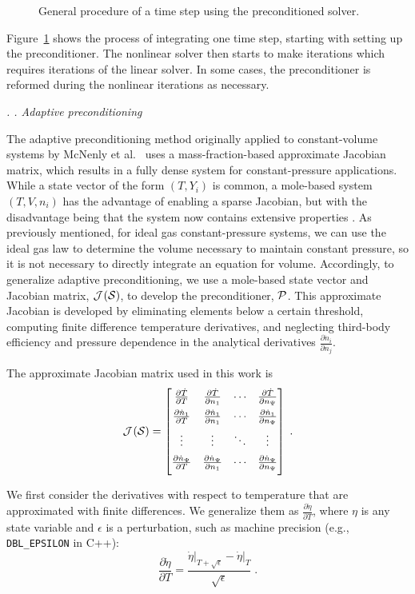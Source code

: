 \documentclass[twocolumn,10pt]{article}
\renewcommand{\subsection}%
              [1]%
              {%
               \bgroup%
               \flushleft%
               \small\em%
               \stepcounter{subsection}%
               \arabic{section}.%
               \arabic{subsection}. #1%
               \par%
               \egroup%
              }%
\newcommand{\sectionTwo}[1]{\subsection{#1} \addvspace{10pt}}
\newcommand{\revised}[2]{#1}  %
\begin{document}
\begin{figure}[htb]
    \centering
    \IntegrationOverview[0.85]{}
    \caption{General procedure of a time step using the preconditioned solver.}
    \label{f:integration_process}
\end{figure}

Figure~\ref{f:integration_process} shows the process of integrating one time step, starting with setting up the preconditioner.
The nonlinear solver then starts to make iterations which requires iterations of the linear solver.
In some cases, the preconditioner is reformed during the nonlinear iterations as necessary.

\sectionTwo{Adaptive preconditioning}
\label{sec:methods-adaptive}

The adaptive preconditioning method originally applied to constant-volume systems
by McNenly et al.~\cite{mcnenly_faster_2015} uses a mass-fraction-based approximate Jacobian matrix, which results in a fully dense system for constant-pressure applications. 
\revised{While a state vector of the form $(T, Y_i)$ is common, a mole-based system $(T, V, n_i)$ has the advantage of enabling a sparse Jacobian, but with the disadvantage being that the system now contains extensive properties \cite{schwer_upgrading_2002}. 
As previously mentioned, for ideal gas constant-pressure systems, we can use the ideal gas law to determine the volume necessary to maintain constant pressure, so it is not necessary to directly integrate an equation for volume.
Accordingly, to generalize adaptive preconditioning,}{editor} we use a mole-based state vector and Jacobian matrix, $\mathcal{J}^{}(\mathcal{S}{})$, to develop the preconditioner, $\mathcal{P}$.
This approximate Jacobian is developed by eliminating elements below a certain threshold, computing finite difference temperature derivatives, and neglecting third-body efficiency and pressure dependence in the analytical derivatives $\frac{\partial \dot{n}_i}{\partial n_j}$.


The approximate Jacobian matrix used in this work is
\begin{equation}
    \J{\S{}} =
    \begin{bmatrix}
        \jacline{\dot{T}}
        \jacline{\dot{n}_{1}}
        \dotsline{}
        \jacline{\dot{n}_{\nspecies}}
    \end{bmatrix} \;.
\end{equation}

%
%
We first consider the derivatives with respect to temperature that are approximated with finite differences.
We generalize them as $\frac{\partial \dot{\eta}}{\partial T}$, where $\eta$ is any state variable and $\epsilon$ is a perturbation, such as machine precision (e.g., \texttt{DBL\_EPSILON} in C++):
\begin{equation}
    \label{eq:temp-dervs}
    \frac{\partial \dot{\eta}}{\partial T} = \frac{\dot{\eta}\big\vert_{T+\sqrt{\epsilon}}-\dot{\eta}\big\vert_{T}}{\sqrt{\epsilon}} \;.
\end{equation}
\end{document}
